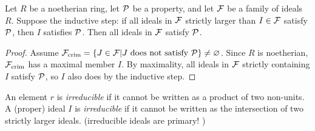  \begin{theorem}
   Let $R$ be a noetherian ring, let $\P$ be a property, and let $\F$ be a family of
   ideals $R$. Suppose the inductive step: if all ideals in $\F$ strictly larger than
   $I\in \F$ satisfy $\P$, then $I$ satisfies $\P$. Then all ideals in
   $\F$ satisfy $\P$.
 \end{theorem}
 \begin{proof}
   Assume $\F_\text{crim} = \{J\in \F|J\text{ does not satisfy }\P\}\neq \varnothing$.
   Since $R$ is noetherian, $\F_\text{crim}$ has a maximal member $I$. By maximality, all
   ideals in $\F$ strictly containing $I$ satisfy $\P$, so $I$ also does by the inductive
   step.
 \end{proof}

 \begin{definition}
   An element $r$ is \emph{irreducible} if it cannot be written as a product of two
   non-units. A (proper) ideal $I$ is \emph{irreducible} if it cannot be written as the
   intersection of two strictly larger ideals. (irreducible ideals are primary!
   )
 \end{definition}

